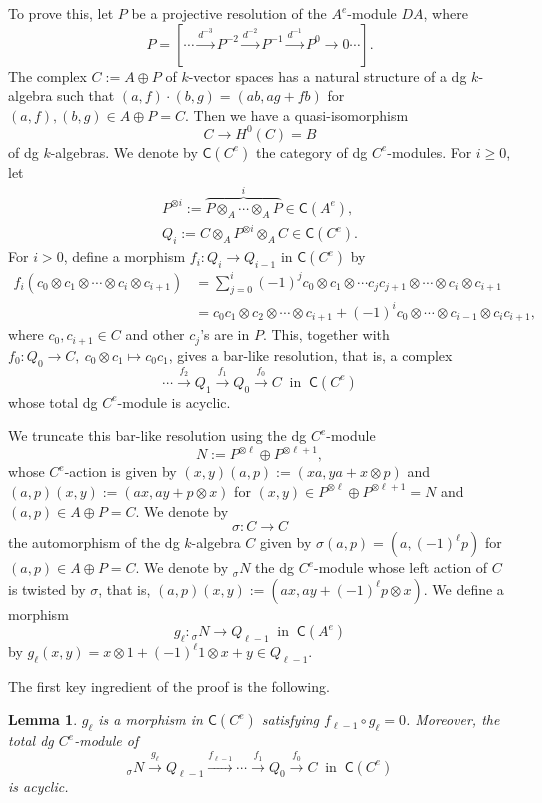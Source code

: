 \documentclass[a4paper,reqno,11pt]{amsart}
\newtheorem{lemma}[theorem]{Lemma}
\theoremstyle{definition}
\newcommand{\CCC}{\mathsf{C}}
\numberwithin{equation}{section}
\begin{document}
To prove this, let $P$ be a projective resolution of the $A^e$-module $DA$, where
\[P=[\cdots\xrightarrow{d^{-3}} P^{-2}\xrightarrow{d^{-2}} P^{-1}\xrightarrow{d^{-1}}P^0\to0\cdots].\]
The complex $C:=A\oplus P$ of $k$-vector spaces has a natural structure of a dg $k$-algebra such that $(a,f)\cdot (b,g)=(ab, ag+fb)$ for $(a,f),(b,g)\in A\oplus P=C$. Then we have a quasi-isomorphism
\[C\to H^0(C)=B\]
of dg $k$-algebras. We denote by $\CCC(C^e)$ the category of dg $C^e$-modules. For $i\ge0$, let
\begin{eqnarray}
P^{\otimes i}:=\overbrace{P\otimes_A\cdots\otimes_AP}^i\in\CCC(A^e),\\
Q_i:=C\otimes_AP^{\otimes i}\otimes_AC\in\CCC(C^e).
\end{eqnarray}
For $i >0$, define a morphism $f_i:Q_i\to Q_{i-1}$ in $\CCC(C^e)$ by
\begin{align*}
f_i(c_0\otimes c_1\otimes\cdots\otimes c_i\otimes c_{i+1})&=\sum_{j=0}^i(-1)^jc_0\otimes c_1\otimes\cdots c_jc_{j+1}\otimes\cdots\otimes c_i\otimes c_{i+1}\\
&=c_0c_1\otimes c_2\otimes\cdots\otimes c_{i+1}+(-1)^i
c_0\otimes \cdots\otimes c_{i-1}\otimes c_ic_{i+1},
\end{align*}
where $c_0,c_{i+1}\in C$ and other $c_j$'s are in $P$.
This, together with $f_0:Q_0\to C,\:c_0\otimes c_1\mapsto c_0c_1$, gives a bar-like resolution, that is, a complex
\[\cdots\xrightarrow{f_2}Q_1\xrightarrow{f_1}Q_0\xrightarrow{f_0}C\ \mbox{ in }\ \CCC(C^e)\]
whose total dg $C^e$-module is acyclic.

We truncate this bar-like resolution using the dg $C^e$-module
\[N:=P^{\otimes\ell}\oplus P^{\otimes\ell+1},\]
whose $C^e$-action is given by $(x,y)(a,p):=(xa,ya+x\otimes p)$ and $(a,p)(x,y):=(ax,ay+p\otimes x)$ for $(x,y)\in P^{\otimes\ell}\oplus P^{\otimes\ell+1}=N$ and $(a,p)\in A\oplus P=C$.  We denote by
\[\sigma:C\to C\]
the automorphism of the dg $k$-algebra $C$ given by $\sigma(a,p)=(a,(-1)^\ell p)$ for $(a,p)\in A\oplus P=C$. We denote by ${}_\sigma N$ the dg $C^e$-module whose left action of $C$ is twisted by $\sigma$, that is, $(a,p)(x,y):=(ax,ay+(-1)^\ell p\otimes x)$.
We define a morphism
\[g_\ell:{}_\sigma N\to Q_{\ell-1}\ \mbox{ in }\ \CCC(A^e)\]
by $g_\ell(x,y)=x\otimes 1+(-1)^\ell 1\otimes x+y\in Q_{\ell-1}$.

The first key ingredient of the proof is the following.

\begin{lemma}\label{truncate bar resolution}
$g_\ell$ is a morphism in $\CCC(C^e)$ satisfying $f_{\ell-1}\circ g_\ell=0$. Moreover, the total dg $C^e$-module of
\begin{equation}\label{bar cpx}{}_\sigma N\xrightarrow{g_\ell}Q_{\ell-1}\xrightarrow{f_{\ell-1}}\cdots\xrightarrow{f_1}Q_0\xrightarrow{f_0}C\ \mbox{ in }\ \CCC(C^e)\end{equation}
is acyclic.
\end{lemma}
\end{document}
